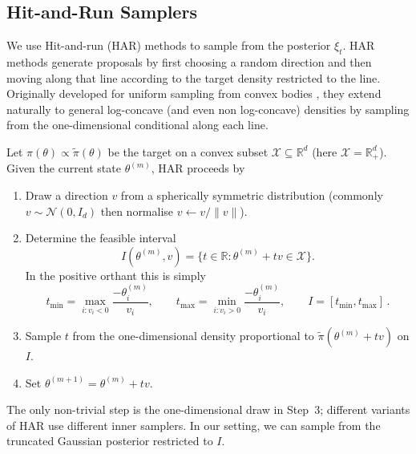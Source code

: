 \documentclass[letter, 12pt]{report}
\newcommand{\R}{\mathbb R}
\newcommand{\1}{\mathbf{1}}
\newcommand{\Normal}{\mathcal{N}}
\theoremstyle{plain}
\theoremstyle{definition}
\theoremstyle{remark}
\begin{document}
\subsection{Hit-and-Run Samplers}
\label{sec:hit-and-run}
We use Hit-and-run (HAR) methods to sample from the posterior $\xi_t$.
HAR methods generate proposals by first choosing a random direction and
then moving along that line according to the target density restricted to the line.
Originally developed for uniform sampling from convex bodies \citep[e.g.][]{smith1984efficient,lovasz1999hit}, they extend naturally to general log-concave (and even non log-concave) densities by sampling from the one-dimensional conditional along each line.

Let $\pi(\theta)\propto \tilde\pi(\theta)$ be the target on a convex subset $\mathcal{X}\subseteq\R^d$ (here $\mathcal{X}=\R_+^d$).
Given the current state $\theta^{(m)}$, HAR proceeds by
\begin{enumerate}
    \item Draw a direction $v$ from a spherically symmetric distribution (commonly $v \sim \Normal(0,I_d)$ then normalise $v\leftarrow v/\|v\|$).
    \item Determine the feasible interval
          \[
              I(\theta^{(m)},v) = \{ t\in\R : \theta^{(m)} + t v \in \mathcal{X}\}.
          \]
          In the positive orthant this is simply
          \[
              t_{\min} = \max_{i:v_i<0} \frac{-\theta^{(m)}_i}{v_i},\qquad
              t_{\max} = \min_{i:v_i>0} \frac{-\theta^{(m)}_i}{v_i},\qquad
              I=[t_{\min},t_{\max}]\,.
          \]
    \item Sample $t$ from the one-dimensional density proportional to $\tilde\pi(\theta^{(m)} + t v)$ on $I$.
    \item Set $\theta^{(m+1)} = \theta^{(m)} + t v$.
\end{enumerate}

The only non-trivial step is the one-dimensional draw in Step~3;
different variants of HAR use different inner samplers.
In our setting, we can sample from the truncated Gaussian posterior
restricted to $I$.
\end{document}
